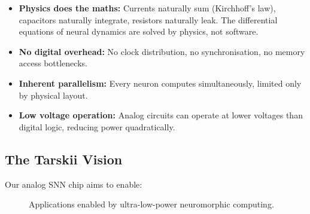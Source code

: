 \documentclass[11pt,a4paper]{article}
\begin{document}
\begin{itemize}
    \item \textbf{Physics does the maths:} Currents naturally sum (Kirchhoff's law), capacitors naturally integrate, resistors naturally leak. The differential equations of neural dynamics are solved by physics, not software.

    \item \textbf{No digital overhead:} No clock distribution, no synchronisation, no memory access bottlenecks.

    \item \textbf{Inherent parallelism:} Every neuron computes simultaneously, limited only by physical layout.

    \item \textbf{Low voltage operation:} Analog circuits can operate at lower voltages than digital logic, reducing power quadratically.
\end{itemize}

\subsection{The Tarskii Vision}

Our analog SNN chip aims to enable:

\begin{figure}[H]
\centering
{}
\caption{Applications enabled by ultra-low-power neuromorphic computing.}
\end{figure}
\end{document}
